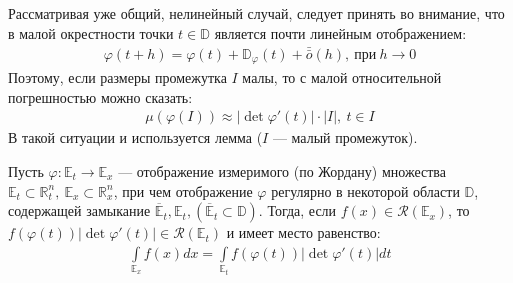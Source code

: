 \begin{clarification}
  Рассматривая уже общий, нелинейный случай, следует принять во внимание, что в
  малой окрестности точки $t \in \mathbb{D}$ является почти линейным
  отображением:
  \begin{gather*}
    \varphi(t + h) = \varphi(t) + \mathbb{D}_\varphi(t) +
    \bar{\bar{o}}\left(h\right), \ \text{при} \ h \to 0
  \end{gather*}
  Поэтому, если размеры промежутка $I$ малы, то с малой относительной
  погрешностью можно сказать:
  \begin{gather*}
    \mu(\varphi(I)) \approx |\det \varphi'(t)| \cdot |I|, \ t \in I
  \end{gather*}
  В такой ситуации и используется лемма ($I$ --- малый промежуток).
\end{clarification}

\begin{theorem}
  Пусть $\varphi: \mathbb{E}_t \to \mathbb{E}_x$ --- отображение измеримого (по
  Жордану) множества $\mathbb{E}_t \subset \mathbb{R}_t^n, \ \mathbb{E}_x
  \subset \mathbb{R}_x^n$, при чем отображение $\varphi$ регулярно в некоторой
  области $\mathbb{D}$, содержащей замыкание $\overline{\mathbb{E}}_t,
  \mathbb{E}_t, (\overline{\mathbb{E}}_t \subset \mathbb{D})$. Тогда, если
  $f(x) \in \mathcal{R}(\mathbb{E}_x)$, то $f(\varphi(t)) |\det \varphi'(t)|
  \in \mathcal{R}(\mathbb{E}_t)$ и имеет место равенство:
  \begin{gather}
    \int\limits_{\mathbb{E}_x} f(x) dx = \int\limits_{\mathbb{E}_t}
    f(\varphi(t)) |\det \varphi'(t)| dt
    \label{th571:eq1}
  \end{gather}
\end{theorem}

